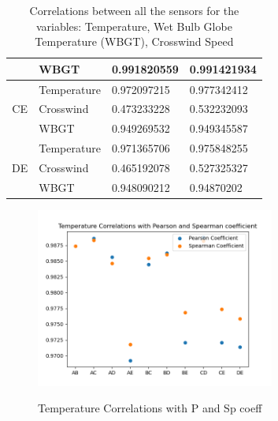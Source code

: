 \documentclass[a4paper,12pt]{article}
\begin{document}
\begin{table}[]
\begin{tabular}{llll}
 		& WBGT                             & 0.991820559                              & 0.991421934                               \\ \hline
 		\multicolumn{1}{|l|}{}                      & \multicolumn{1}{l|}{Temperature} & \multicolumn{1}{l|}{0.972097215}         & \multicolumn{1}{l|}{0.977342412}          \\ \hline
 		\multicolumn{1}{|c|}{CE}                    & \multicolumn{1}{l|}{Crosswind}   & \multicolumn{1}{l|}{0.473233228}         & \multicolumn{1}{l|}{0.532232093}          \\ \hline
 		\multicolumn{1}{|l|}{}                      & \multicolumn{1}{l|}{WBGT}        & \multicolumn{1}{l|}{0.949269532}         & \multicolumn{1}{l|}{0.949345587}          \\ \hline
 		& Temperature                      & 0.971365706                              & 0.975848255                               \\
 		\multicolumn{1}{c}{DE}                      & Crosswind                        & 0.465192078                              & 0.527325327                               \\
 		& WBGT                             & 0.948090212                              & 0.94870202                               
 	\end{tabular}
 	\caption{Correlations between all the sensors for the variables: Temperature, Wet Bulb Globe Temperature (WBGT), Crosswind Speed}\cite{Maiullari2020}
\end{table}
   \begin{figure}[H] 
 	\centering
 	\includegraphics[width=0.7\textwidth]{Temperature Correlations with P and Sp coeff.png}
 	\caption{Temperature Correlations with P and Sp coeff}\cite{Maiullari2020}
 \end{figure}
\end{document}
